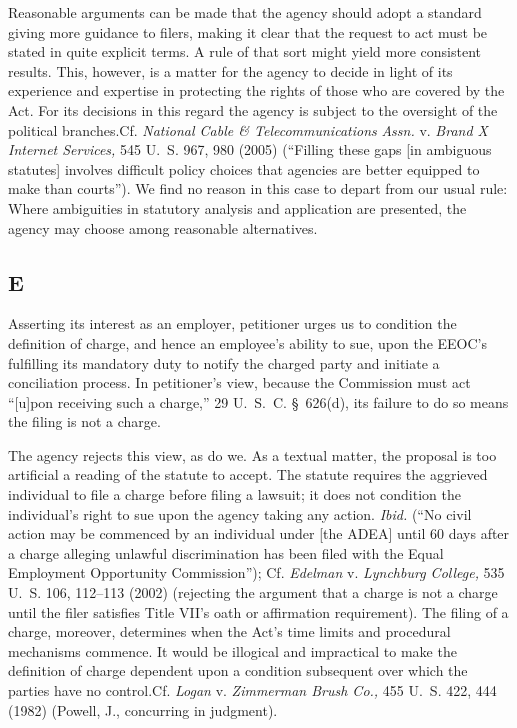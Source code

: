   Reasonable arguments can be made that the agency should adopt a
standard giving more guidance to filers, making it clear that the
request to act must be stated in quite explicit terms. A rule of that
sort might yield more consistent results. This, however, is a matter
for the agency to decide in light of its experience and expertise in
protecting the rights of those who are covered by the Act. For its
decisions in this regard the agency is subject to the oversight of
the political branches.Cf. \emph{National Cable \& Telecommunications}
\emph{Assn.} v. \emph{Brand X Internet Services,} 545 U.~S. 967, 980 (2005)
(``Filling these gaps [in ambiguous statutes] involves difficult policy
choices that agencies are better equipped to make than courts'').
We find no reason in this case to depart from our usual rule: Where
ambiguities in statutory analysis and application are presented, the
agency may choose among reasonable alternatives.

\subsection{E}

  Asserting its interest as an employer, petitioner urges us to
condition the definition of charge, and hence an employee's ability
to sue, upon the EEOC's fulfilling its mandatory duty to notify the
charged party and initiate a conciliation process. In petitioner's
view, because the Commission must act ``[u]pon receiving such a
charge,'' 29 U.~S.~C. \S~626(d), its failure to do so means the
filing is not a charge.

  The agency rejects this view, as do we. As a textual matter, the
proposal is too artificial a reading of the statute to accept. The
statute requires the aggrieved individual to file \newpage  a charge
before filing a lawsuit; it does not condition the individual's right
to sue upon the agency taking any action. \emph{Ibid.} (``No civil
action may be commenced by an individual under [the ADEA] until 60
days after a charge alleging unlawful discrimination has been filed
with the Equal Employment Opportunity Commission''); Cf. \emph{Edelman}
v. \emph{Lynchburg College,} 535 U.~S. 106, 112--113 (2002) (rejecting
the argument that a charge is not a charge until the filer satisfies
Title VII's oath or affirmation requirement). The filing of a
charge, moreover, determines when the Act's time limits and procedural
mechanisms commence. It would be illogical and impractical to make the
definition of charge dependent upon a condition subsequent over which
the parties have no control.Cf. \emph{Logan} v. \emph{Zimmerman Brush Co.,}
455 U.~S. 422, 444 (1982) (Powell, J., concurring in judgment).

